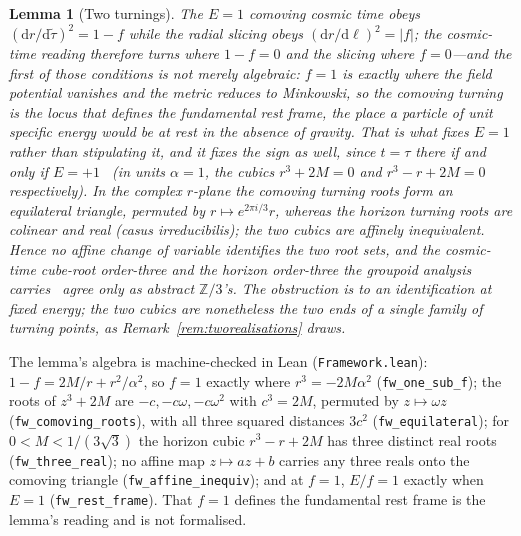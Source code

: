 \documentclass[11pt,a4paper]{article}
\theoremstyle{plain}
\newtheorem{lemma}{Lemma}
\theoremstyle{definition}
\theoremstyle{remark}
\begin{document}
\begin{lemma}[Two turnings]\label{lem:twoturnings}
The $E{=}1$ comoving cosmic time obeys $(\mathrm{d}r/\mathrm{d}\tilde\tau)^2=1-f$ while the radial slicing obeys $(\mathrm{d}r/\mathrm{d}\ell)^2=|f|$; the cosmic-time reading therefore turns where $1-f=0$ and the slicing where $f=0$---\emph{and the first of those conditions is not merely algebraic}: $f=1$ is exactly where the field potential vanishes and the metric reduces to Minkowski, so the comoving turning is \emph{the locus that defines the fundamental rest frame}, the place a particle of unit specific energy would be at rest in the absence of gravity. \emph{That is what fixes $E=1$ rather than stipulating it}, and it fixes the sign as well, since $t=\tau$ there if and only if $E=+1$~\cite[App.]{Janzen2015} (in units $\alpha{=}1$, the cubics $r^3+2M=0$ and $r^3-r+2M=0$ respectively). In the complex $r$-plane the comoving turning roots form an equilateral triangle, permuted by $r\mapsto e^{2\pi i/3}r$, whereas the horizon turning roots are colinear and real (casus irreducibilis); the two cubics are affinely inequivalent. Hence no affine change of variable identifies the two root sets, and the cosmic-time cube-root order-three and the horizon order-three the groupoid analysis carries~\cite{JanzenGroupoid} agree only as abstract $\mathbb{Z}/3$'s. The obstruction is to an identification at fixed energy; the two cubics are nonetheless the two ends of a single family of turning points, as Remark~\ref{rem:tworealisations} draws.
\end{lemma}

\noindent The lemma's algebra is machine-checked in Lean (\texttt{Framework.lean}): $1-f=2M/r+r^{2}/\alpha^{2}$, so $f=1$ exactly where $r^{3}=-2M\alpha^{2}$ (\texttt{fw\_one\_sub\_f}); the roots of $z^{3}+2M$ are $-c,-c\omega,-c\omega^{2}$ with $c^{3}=2M$, permuted by $z\mapsto\omega z$ (\texttt{fw\_comoving\_roots}), with all three squared distances $3c^{2}$ (\texttt{fw\_equilateral}); for $0<M<1/(3\sqrt3)$ the horizon cubic $r^{3}-r+2M$ has three distinct real roots (\texttt{fw\_three\_real}); no affine map $z\mapsto az+b$ carries any three reals onto the comoving triangle (\texttt{fw\_affine\_inequiv}); and at $f=1$, $E/f=1$ exactly when $E=1$ (\texttt{fw\_rest\_frame}). That $f=1$ defines the fundamental rest frame is the lemma's reading and is not formalised.
\end{document}
